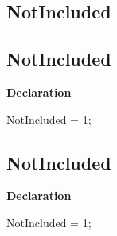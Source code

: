 \documentclass{report}
\newif\ifpdf
\begin{document}
\subsection*{\large{\textbf{NotIncluded}}\normalsize\hspace{1ex}\hrulefill}
\else
\subsection*{NotIncluded}
\fi
\label{ok_if_directive-NotIncluded}
\begin{list}{}{
\setlength{\itemindent}{0cm}
\setlength{\listparindent}{0cm}
\setlength{\leftmargin}{\evensidemargin}
\addtolength{\leftmargin}{\tmplength}
\settowidth{\labelsep}{X}
\addtolength{\leftmargin}{\labelsep}
\setlength{\labelwidth}{\tmplength}
}
\item[\textbf{Declaration}\hfill]
\ifpdf
\begin{flushleft}
\fi
\begin{ttfamily}
NotIncluded = 1;\end{ttfamily}

\ifpdf
\end{flushleft}
\fi

\end{list}
\ifpdf
\subsection*{\large{\textbf{NotIncluded}}\normalsize\hspace{1ex}\hrulefill}
\else
\subsection*{NotIncluded}
\fi
\label{ok_if_directive-NotIncluded}
\begin{list}{}{
\setlength{\itemindent}{0cm}
\setlength{\listparindent}{0cm}
\setlength{\leftmargin}{\evensidemargin}
\addtolength{\leftmargin}{\tmplength}
\settowidth{\labelsep}{X}
\addtolength{\leftmargin}{\labelsep}
\setlength{\labelwidth}{\tmplength}
}
\item[\textbf{Declaration}\hfill]
\ifpdf
\begin{flushleft}
\fi
\begin{ttfamily}
NotIncluded = 1;\end{ttfamily}

\ifpdf
\end{flushleft}
\fi

\end{list}
\end{document}
